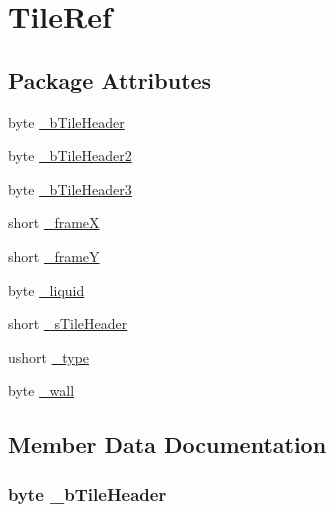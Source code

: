 \hypertarget{structOTA_1_1Memory_1_1TileRef}{}\section{Tile\+Ref}
\label{structOTA_1_1Memory_1_1TileRef}
\subsection*{Package Attributes}
\begin{DoxyCompactItemize}
\item 
byte \hyperlink{structOTA_1_1Memory_1_1TileRef_a76d52c52f7ad7d4aed8f084ed86c0e43}{\+\_\+b\+Tile\+Header}
\item 
byte \hyperlink{structOTA_1_1Memory_1_1TileRef_af67448ac6ef2c408bfd9df17e947b2c7}{\+\_\+b\+Tile\+Header2}
\item 
byte \hyperlink{structOTA_1_1Memory_1_1TileRef_a4db8e73acd2895b68ace76c66662ff05}{\+\_\+b\+Tile\+Header3}
\item 
short \hyperlink{structOTA_1_1Memory_1_1TileRef_a2c57de075b633d2c1e15ced2cf97b7ee}{\+\_\+frame\+X}
\item 
short \hyperlink{structOTA_1_1Memory_1_1TileRef_ac2f20e89b876df8354cd85aaee7ec4e8}{\+\_\+frame\+Y}
\item 
byte \hyperlink{structOTA_1_1Memory_1_1TileRef_a177d3b4020f6ac1a853c1bf20c11016e}{\+\_\+liquid}
\item 
short \hyperlink{structOTA_1_1Memory_1_1TileRef_a8c4e25f032899f19d00e20d1b442cbf9}{\+\_\+s\+Tile\+Header}
\item 
ushort \hyperlink{structOTA_1_1Memory_1_1TileRef_a20798f220457778ecbdf14011b784217}{\+\_\+type}
\item 
byte \hyperlink{structOTA_1_1Memory_1_1TileRef_a5fe6240cebfe47a956acae69fd5257c0}{\+\_\+wall}
\end{DoxyCompactItemize}


\subsection{Member Data Documentation}
\hypertarget{structOTA_1_1Memory_1_1TileRef_a76d52c52f7ad7d4aed8f084ed86c0e43}{}
\subsubsection[{\+\_\+b\+Tile\+Header}]{\setlength{\rightskip}{0pt plus 5cm}byte \+\_\+b\+Tile\+Header\hspace{0.3cm}{\ttfamily [package]}}\label{structOTA_1_1Memory_1_1TileRef_a76d52c52f7ad7d4aed8f084ed86c0e43}
\hypertarget{structOTA_1_1Memory_1_1TileRef_af67448ac6ef2c408bfd9df17e947b2c7}{}

